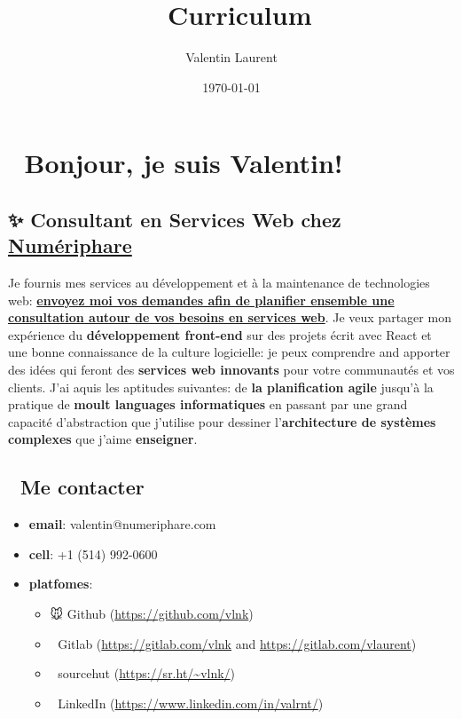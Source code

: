 \documentclass[11pt]{article}
\author{Valentin Laurent}
\date{\today}
\title{👔 Curriculum}
\begin{document}
\maketitle
\section{👋 Bonjour, je suis Valentin!}
\label{sec:orgd670c7d}
\subsection{✨ \textbf{Consultant en Services Web} chez \href{https://www.numeriphare.com/}{Numériphare}}
\label{sec:orgc5ca54c}
Je fournis mes services au développement et à la maintenance de technologies web: \textbf{\href{https://framaforms.org/contact-numeriphare-fr-1666985704}{envoyez moi vos demandes afin de planifier ensemble une consultation autour de vos besoins en services web}}. Je veux partager mon expérience du \textbf{développement front-end} sur des projets écrit avec React et une bonne connaissance de la culture logicielle: je peux comprendre and apporter des idées qui feront des \textbf{services web innovants} pour votre communautés et vos clients. J'ai aquis les aptitudes suivantes: de \textbf{la planification agile} jusqu'à la pratique de \textbf{moult languages informatiques} en passant par une grand capacité d'abstraction que j'utilise pour dessiner l'\textbf{architecture de systèmes complexes} que j'aime \textbf{enseigner}.

\subsection{📇 Me contacter}
\label{sec:org79fad73}
\begin{itemize}
\item \textbf{email}: valentin@numeriphare.com
\item \textbf{cell}: +1 (514) 992-0600
\item \textbf{platfomes}:
\begin{itemize}
\item 🐭 Github (\url{https://github.com/vlnk})
\item 🚀 Gitlab (\url{https://gitlab.com/vlnk} and \url{https://gitlab.com/vlaurent})
\item 🌲 sourcehut (\url{https://sr.ht/\~vlnk/})
\item 👞 LinkedIn (\url{https://www.linkedin.com/in/valrnt/})
\end{itemize}
\end{itemize}
\end{document}
